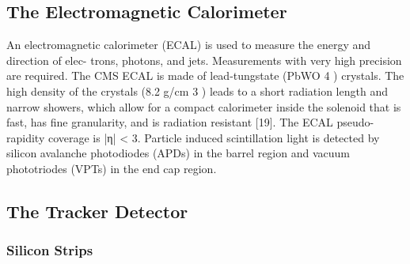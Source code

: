 \subsection{The Electromagnetic Calorimeter}
An electromagnetic calorimeter (ECAL) is used to measure the energy and direction of elec-
trons, photons, and jets. Measurements with very high precision are required. The CMS ECAL
is made of lead-tungstate (PbWO 4 ) crystals. The high density of the crystals (8.2 g/cm 3 ) leads to a short radiation length and narrow showers, which allow for a compact calorimeter inside
the solenoid that is fast, has fine granularity, and is radiation resistant [19]. The ECAL pseudo-
rapidity coverage is |η| < 3. Particle induced scintillation light is detected by silicon avalanche
photodiodes (APDs) in the barrel region and vacuum phototriodes (VPTs) in the end cap
region.

\subsection{The Tracker Detector}


\subsubsection{Silicon Strips}


